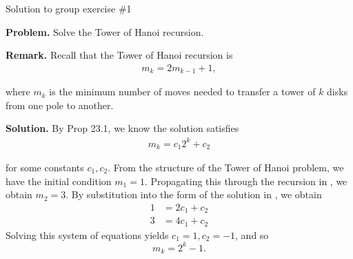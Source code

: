 \documentclass[10pt]{beamer}
\begin{document}
\begin{frame}{Solution to group exercise \#1}
\footnotesize 
 
\colorbox{red!30}{\textbf{Problem.}} Solve the Tower of Hanoi recursion.  
\vfill 

\colorbox{blue!30}{\textbf{Remark.}} Recall that the Tower of Hanoi recursion is 
\begin{align}
m_k = 2 m_{k-1} + 1,
\label{eq:hanoi_recursion}	
\end{align}

where $m_k$ is the minimum number of moves needed to transfer a tower of $k$ disks from one pole to another. 
\vfill 

\colorbox{green!30}{\textbf{Solution.}} By Prop 23.1, we know the solution satisfies
\begin{align}
 m_k = c_1 2^k + c_2
 \label{eq:hanoi_solution}	
\end{align}

for some constants $c_1, c_2$.  From the structure of the Tower of Hanoi problem, we have the initial condition $m_1=1$. Propagating this through the recursion in , we obtain $m_2=3$.  By substitution into the form of the solution in , we obtain
%
\begin{align*}
1 &= 2c_1 + c_2 \\
3 &= 4c_1 + c_2	
\end{align*}
%
Solving this system of equations yields $c_1=1, c_2=-1$, and so
\[m_k = 2^k - 1.\]

\end{frame}
\end{document}
